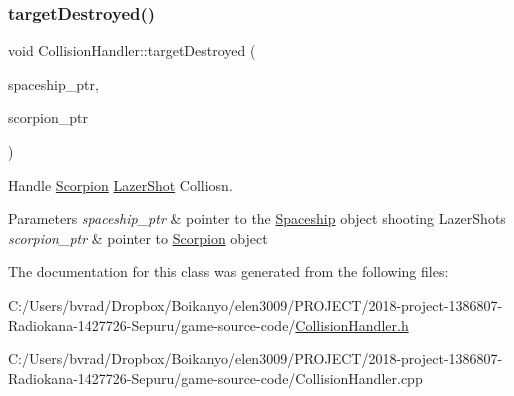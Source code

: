 \subsubsection{\texorpdfstring{target\+Destroyed()}{targetDestroyed()}\hspace{0.1cm}{\footnotesize\ttfamily [3/3]}}
{\footnotesize\ttfamily void Collision\+Handler\+::target\+Destroyed (\begin{DoxyParamCaption}\item[{shared\+\_\+ptr$<$ \mbox{\hyperlink{class_spaceship}{Spaceship}} $>$}]{spaceship\+\_\+ptr,  }\item[{shared\+\_\+ptr$<$ \mbox{\hyperlink{class_scorpion}{Scorpion}} $>$}]{scorpion\+\_\+ptr }\end{DoxyParamCaption})}



Handle \mbox{\hyperlink{class_scorpion}{Scorpion}} \mbox{\hyperlink{class_lazer_shot}{Lazer\+Shot}} Colliosn. 


\begin{DoxyParams}{Parameters}
{\em spaceship\+\_\+ptr} & pointer to the \mbox{\hyperlink{class_spaceship}{Spaceship}} object shooting Lazer\+Shots \\
\hline
{\em scorpion\+\_\+ptr} & pointer to \mbox{\hyperlink{class_scorpion}{Scorpion}} object \\
\hline
\end{DoxyParams}


The documentation for this class was generated from the following files\+:\begin{DoxyCompactItemize}
\item 
C\+:/\+Users/bvrad/\+Dropbox/\+Boikanyo/elen3009/\+P\+R\+O\+J\+E\+C\+T/2018-\/project-\/1386807-\/\+Radiokana-\/1427726-\/\+Sepuru/game-\/source-\/code/\mbox{\hyperlink{_collision_handler_8h}{Collision\+Handler.\+h}}\item 
C\+:/\+Users/bvrad/\+Dropbox/\+Boikanyo/elen3009/\+P\+R\+O\+J\+E\+C\+T/2018-\/project-\/1386807-\/\+Radiokana-\/1427726-\/\+Sepuru/game-\/source-\/code/Collision\+Handler.\+cpp\end{DoxyCompactItemize}
